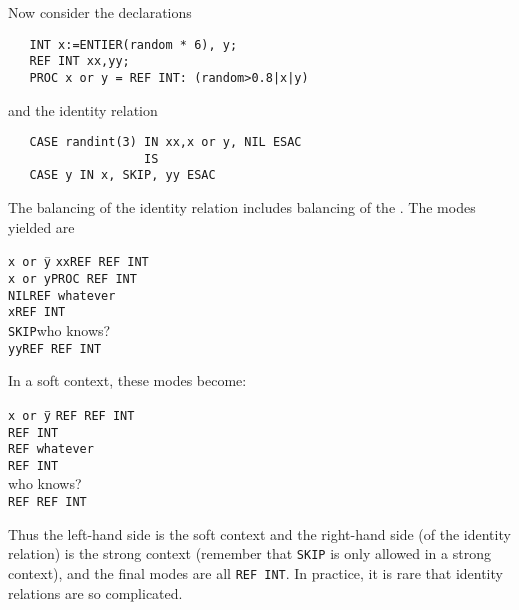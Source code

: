 Now consider the declarations
\begin{verbatim}
   INT x:=ENTIER(random * 6), y;
   REF INT xx,yy;
   PROC x or y = REF INT: (random>0.8|x|y)
\end{verbatim}
\noindent
and the identity relation
\begin{verbatim}
   CASE randint(3) IN xx,x or y, NIL ESAC
                   IS
   CASE y IN x, SKIP, yy ESAC
\end{verbatim}
\noindent
The balancing of the identity relation includes balancing of the
. The modes yielded are
\begin{tabbing}
\indent\=\verb|x or y|\qquad\=\kill
\+\verb|xx|\>\verb|REF REF INT|\\
\verb|x or y|\>\verb|PROC REF INT|\\
\verb|NIL|\>\verb|REF whatever|\\
\verb|x|\>\verb|REF INT|\\
\verb|SKIP|\>who knows?\\
\verb|yy|\>\verb|REF REF INT|
\end{tabbing}
In a soft context, these modes become:
\begin{tabbing}
\indent\=\verb|x or y|\qquad\=\qquad\=\kill
\+\+\+\verb|REF REF INT|\\
\verb|REF INT|\\
\verb|REF whatever|\\
\verb|REF INT|\\
who knows?\\
\verb|REF REF INT|
\end{tabbing}
Thus the left-hand side is the soft context and the right-hand side (of
the identity relation) is the strong context (remember that \verb|SKIP|
is only allowed in a strong context), and the final modes are all
\verb|REF INT|. In practice, it is rare that identity relations are so
complicated.

